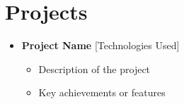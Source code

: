 \section*{Projects}
\begin{itemize}
    \item[] \textbf{Project Name} \hfill [Technologies Used]
    \begin{itemize}
        \item Description of the project
        \item Key achievements or features
    \end{itemize}
\end{itemize}
\sectionspace 